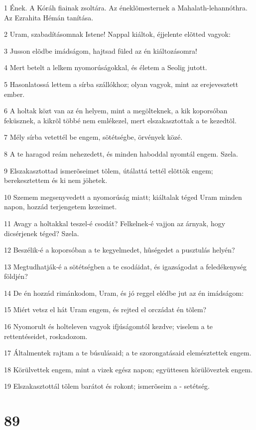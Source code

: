 \par 1 Ének. A Kóráh fiainak zsoltára. Az éneklõmesternek a Mahalath-lehannóthra. Az Ezrahita Hémán tanítása.
\par 2 Uram, szabadításomnak Istene! Nappal kiáltok, éjjelente elõtted vagyok:
\par 3 Jusson elõdbe imádságom, hajtsad füled az én kiáltozásomra!
\par 4 Mert betelt a lelkem nyomorúságokkal, és életem a Seolig jutott.
\par 5 Hasonlatossá lettem a sírba szállókhoz; olyan vagyok, mint az erejevesztett ember.
\par 6 A holtak közt van az én helyem, mint a megölteknek, a kik koporsóban feküsznek, a kikrõl többé nem emlékezel, mert elszakasztottak a te kezedtõl.
\par 7 Mély sírba vetettél be engem, sötétségbe, örvények közé.
\par 8 A te haragod reám nehezedett, és minden haboddal nyomtál engem. Szela.
\par 9 Elszakasztottad ismerõseimet tõlem, útálattá tettél elõttök engem; berekesztettem és ki nem jöhetek.
\par 10 Szemem megsenyvedett a nyomorúság miatt; kiáltalak téged Uram minden napon, hozzád terjengetem kezeimet.
\par 11 Avagy a holtakkal teszel-é csodát? Felkelnek-é vajjon az árnyak, hogy dicsérjenek téged? Szela.
\par 12 Beszélik-é a koporsóban a te kegyelmedet, hûségedet a pusztulás helyén?
\par 13 Megtudhatják-é a sötétségben a te csodáidat, és igazságodat a feledékenység földjén?
\par 14 De én hozzád rimánkodom, Uram, és jó reggel elédbe jut az én imádságom:
\par 15 Miért vetsz el hát Uram engem, és rejted el orczádat én tõlem?
\par 16 Nyomorult és holteleven vagyok ifjúságomtól kezdve; viselem a te rettentéseidet, roskadozom.
\par 17 Általmentek rajtam a te búsulásaid; a te szorongatásaid elemésztettek engem.
\par 18 Körülvettek engem, mint a vizek egész napon; együttesen körülöveztek engem.
\par 19 Elszakasztottál tõlem barátot és rokont; ismerõseim a - setétség.

\chapter{89}

